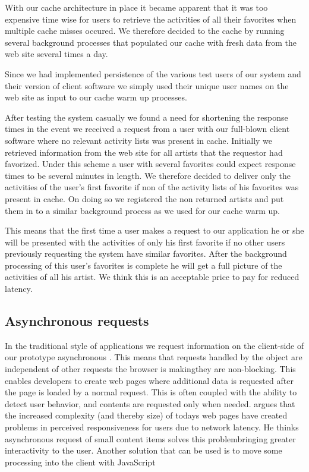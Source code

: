 With our cache architecture in place it became apparent that it was too
expensive time wise for users to retrieve the activities of all their
favorites when multiple cache misses occured. We therefore decided to
 the cache by running several background processes that populated
our cache with fresh data from the \urort{} web site several times a day.

Since we had implemented persistence of the various test users of our system
and their version of client software we simply used their unique user names
on the \urort{} web site as input to our cache warm up processes.

After testing the system casually we found a need for shortening the response
times in the event we received a request from a user with our full-blown
client software where no relevant activity lists
was present in cache. Initially we retrieved information from the \urort{} web
site for all artists that the requestor had favorized. Under this scheme a
user with several favorites could expect response times to be several minutes
in length. We therefore decided to deliver only the activities of the user's
first favorite if non of the activity lists of his favorites was present in
cache. On doing so we registered the non returned artists and put them in to a
similar background process as we used for our cache warm up. 

This means that the first time a user makes a request to our application he
or she will be presented with the activities of only his first favorite if no
other users previously requesting the system have similar favorites. After the
background processing of this user's favorites is complete he will get a full
picture of the activities of all his artist. We think this is an acceptable
price to pay for reduced latency.

\subsection{Asynchronous requests}

In the traditional style of  applications we request information on
the client-side of our prototype asynchronous%
.
This means that requests handled by the  object
are independent of other requests the browser is making\dash{}they
are non-blocking. This enables developers to create web pages where additional
data is requested after the page is loaded by a normal  request.
This is often coupled with the ability to detect user behavior, and contents
are requested only when needed. \citet[pp.281--282]{stamey06} argues that
the increased complexity (and thereby size) of todays web pages have created
problems in perceived responsiveness for users due to network latency. He
thinks asynchronous request of small content items solves this
problem\dash{}bringing greater interactivity to the user. Another solution
that can be used is to move some processing into the client with
JavaScript \citep[]{jazayeri07}

